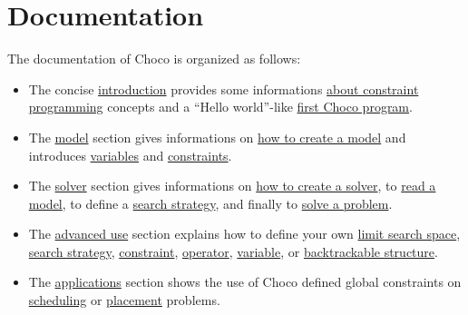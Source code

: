 \part{Documentation}\label{ch:doc}\hypertarget{ch:doc}{}

The documentation of Choco is organized as follows:
\begin{itemize}
\item 
The concise \hyperlink{doc:introduction}{introduction} provides some informations \hyperlink{introduction:aboutconstraintprogramming}{about constraint programming} concepts and a ``Hello world''-like \hyperlink{introduction:myfirstchocoprogram}{first Choco program}.
\item 
The \hyperlink{doc:model}{model} section gives informations on \hyperlink{doc:model}{how to create a model} and introduces \hyperlink{model:variables}{variables} and \hyperlink{model:constraints}{constraints}.
\item 
The \hyperlink{doc:solver}{solver} section gives informations on \hyperlink{doc:solver}{how to create a solver}, to \hyperlink{doc:solver}{read a model}, to define a \hyperlink{solver:searchstrategy}{search strategy}, and finally to \hyperlink{solver:solveaproblem}{solve a problem}.
\item 
The \hyperlink{doc:advanced}{advanced use} section explains how to define your own \hyperlink{advanced:defineyourownlimitsearchspace}{limit search space}, \hyperlink{advanced:defineyourownsearchstrategy}{search strategy}, \hyperlink{advanced:defineyourownconstraint}{constraint}, \hyperlink{advanced:defineyourownoperator}{operator}, \hyperlink{advanced:defineyourownvariable}{variable}, or \hyperlink{advanced:backtrackablestructures}{backtrackable structure}.
\item 
The \hyperlink{doc:applications}{applications} section shows the use of Choco defined global constraints on \hyperlink{schedulinganduseofthecumulative:schedulinganduseofthecumulativeconstraint}{scheduling} or \hyperlink{geostdescription:placementanduseofthegeostconstraint}{placement} problems.
\end{itemize}


